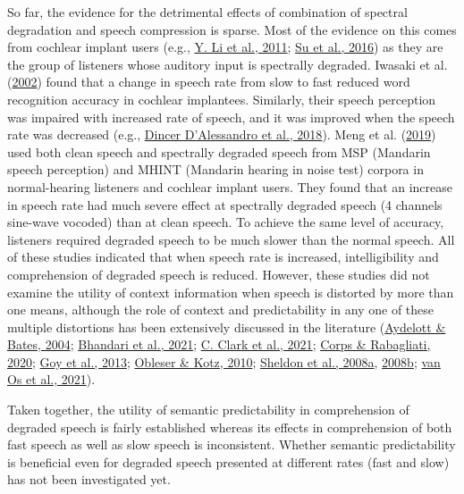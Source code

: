 \documentclass[a4paper, nobind]{templates/ociamthesis}
\begin{document}
So far, the evidence for the detrimental effects of combination of spectral degradation and speech compression is sparse. Most of the evidence on this comes from cochlear implant users (e.g., \protect\hyperlink{ref-Li2011}{Y. Li et al., 2011}; \protect\hyperlink{ref-Su2016}{Su et al., 2016}) as they are the group of listeners whose auditory input is spectrally degraded.
Iwasaki et al. (\protect\hyperlink{ref-Iwasaki2002}{2002}) found that a change in speech rate from slow to fast reduced word recognition accuracy in cochlear implantees.
Similarly, their speech perception was impaired with increased rate of speech, and it was improved when the speech rate was decreased (e.g., \protect\hyperlink{ref-Dincer2018}{Dincer D'Alessandro et al., 2018}).
Meng et al. (\protect\hyperlink{ref-Meng2019}{2019}) used both clean speech and spectrally degraded speech from MSP (Mandarin speech perception) and MHINT (Mandarin hearing in noise test) corpora in normal-hearing listeners and cochlear implant users.
They found that an increase in speech rate had much severe effect at spectrally degraded speech (4 channels sine-wave vocoded) than at clean speech.
To achieve the same level of accuracy, listeners required degraded speech to be much slower than the normal speech.
All of these studies indicated that when speech rate is increased, intelligibility and comprehension of degraded speech is reduced.
However, these studies did not examine the utility of context information when speech is distorted by more than one means, although the role of context and predictability in any one of these multiple distortions has been extensively discussed in the literature
(\protect\hyperlink{ref-Aydelott2004}{Aydelott \& Bates, 2004}; \protect\hyperlink{ref-Bhandari2021}{Bhandari et al., 2021}; \protect\hyperlink{ref-Clark2021}{C. Clark et al., 2021}; \protect\hyperlink{ref-Corps2020}{Corps \& Rabagliati, 2020}; \protect\hyperlink{ref-Goy2013}{Goy et al., 2013}; \protect\hyperlink{ref-Obleser2010}{Obleser \& Kotz, 2010}; \protect\hyperlink{ref-Sheldon2008a}{Sheldon et al., 2008a}, \protect\hyperlink{ref-Sheldon2008b}{2008b}; \protect\hyperlink{ref-vanOs2021}{van Os et al., 2021}).

Taken together, the utility of semantic predictability in comprehension of degraded speech is fairly established whereas its effects in comprehension of both fast speech as well as slow speech is inconsistent.
Whether semantic predictability is beneficial even for degraded speech presented at different rates (fast and slow) has not been investigated yet.
\end{document}
